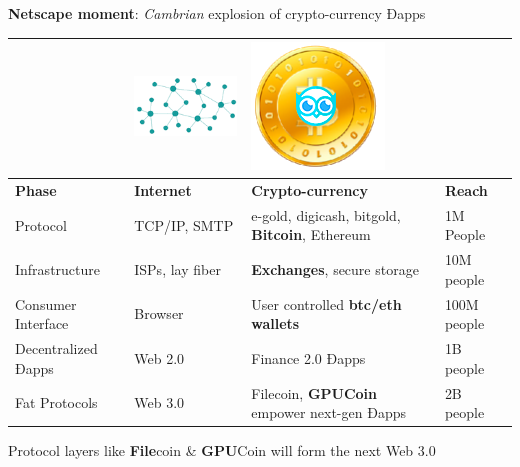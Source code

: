 \textbf{Netscape moment}: \emph{Cambrian} explosion of crypto-currency Ðapps
 

 \begin{adjustbox}{width=.7\textwidth}
\begin{tabularx} {\textwidth}{|X|X|X|X|}
 \hline
& \includegraphics[scale=0.2]{static/decentnew} & \includegraphics[scale=0.2]{static/hootcoin} & \\
 \hline
\textbf{Phase} & \textbf{Internet} & \textbf{Crypto-currency} & \textbf{Reach}\\
\hline
Protocol & TCP/IP, SMTP & e-gold, digicash, bitgold, \textbf{Bitcoin}, Ethereum & 1M People \\
\hline
Infrastructure & ISPs, lay fiber & \textbf{Exchanges}, secure storage & 10M people \\
\hline
Consumer Interface & Browser & User controlled \textbf{btc/eth wallets} & 100M people \\
\hline
Decentralized Ðapps & Web 2.0 & Finance 2.0 Ðapps & 1B people\\
\hline
Fat Protocols & Web 3.0 & Filecoin, \textbf{GPUCoin} empower next-gen Ðapps & 2B people\\

\hline
\end{tabularx}
\end{adjustbox}

Protocol layers like \textbf{File}coin \& \textbf{GPU}Coin will form the next Web 3.0